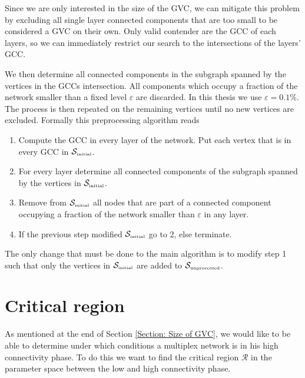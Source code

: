 \documentclass[
11pt, %
english, %
singlespacing, %
nolistspacing, %
liststotoc, %
headsepline, %
]{MastersDoctoralThesis} %
\begin{document}
Since we are only interested in the size of the GVC, we can mitigate this problem by excluding all single layer connected components that are too small to be considered a GVC on their own. Only valid contender are the GCC of each layers, so we can immediately restrict our search to the intersections of the layers' GCC.

We then determine all connected components in the subgraph spanned by the vertices in the GCCs intersection. All components which occupy a fraction of the network smaller than a fixed level $\varepsilon$ are discarded. In this thesis we use $\varepsilon = 0.1\%$. The process is then repeated on the remaining vertices until no new vertices are excluded. Formally this preprocessing algorithm reads

\begin{enumerate}
	\item Compute the GCC in every layer of the network. Put each vertex that is in every GCC in $\mathcal{S}_{\text{\tiny initial}}$.
	\item For every layer determine all connected components of the subgraph spanned by the vertices in $\mathcal{S}_{\text{\tiny initial}}$.
	\item Remove from $\mathcal{S}_{\text{\tiny initial}}$ all nodes that are part of a connected component occupying a fraction of the network smaller than $\varepsilon$ in any layer.
	\item If the previous step modified $\mathcal{S}_{\text{\tiny initial}}$ go to 2, else terminate.
\end{enumerate}

The only change that must be done to the main algorithm is to modify step 1 such that only the vertices in $\mathcal{S}_{\text{\tiny initial}}$ are added to $\mathcal{S}_{\text{\tiny unprocessed}}$.

\section{Critical region}
\label{Section: Boundary condition for multilayer}

As mentioned at the end of Section \ref{Section: Size of GVC}, we would like to be able to determine under which conditions a multiplex network is in his high connectivity phase. To do this we want to find the critical region $\mathcal{R}$ in the parameter space between the low and high connectivity phase.
\end{document}
